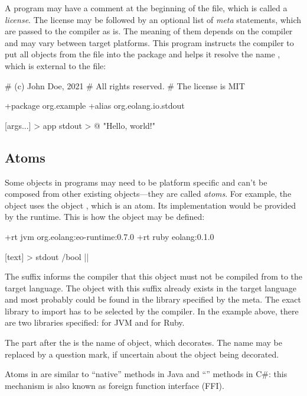 A program may have a comment at the beginning of the file, which
is called a \emph{license}. The license may be followed by an optional
list of \emph{meta} statements, which are passed to the compiler
as is. The meaning of them depends on the compiler and may vary
between target platforms. This program instructs the compiler
to put all objects from the file into the package 
and helps it resolve the name , which is external
to the file:

\begin{ffcode}
# (c) John Doe, 2021
# All rights reserved.
# The license is MIT

+package org.example
+alias org.eolang.io.stdout

[args...] > app
  stdout > @
    "Hello, world!\n"
\end{ffcode}

\subsection{Atoms}

Some objects in \eo{} programs may need to be platform specific
and can't be composed from other existing objects---they are called
\emph{atoms}.
For example, the object  uses the object ,
which is an atom. Its implementation would be provided by the
runtime. This is how the object may be defined:

\begin{ffcode}
+rt jvm org.eolang:eo-runtime:0.7.0
+rt ruby eolang:0.1.0

[text] > stdout /bool |$\label{ln:stdout}$|
\end{ffcode}

The  suffix informs the compiler that this object must
not be compiled from \eo{} to the target language. The object
with this suffix already exists in the target language and most
probably could be found in the library specified by the 
meta. The exact library to import has to be selected by the compiler.
In the example above, there are two libraries specified: for JVM and
for Ruby.

The  part after the \ff{/} is the name of
object, which  decorates. The name may be replaced by
a question mark, if uncertain about the object being decorated.

Atoms in \eo{} are similar to ``native'' methods in Java and ``'' methods in C\#: this mechanism is also known as foreign function interface (FFI).

